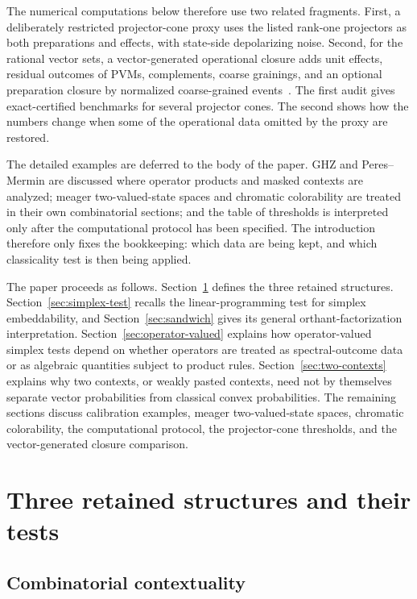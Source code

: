\documentclass[aps,pra,twocolumn,superscriptaddress,nofootinbib]{revtex4-2}
\begin{document}
The numerical computations below therefore use two related fragments.  First, a deliberately restricted projector-cone proxy uses the listed rank-one projectors as both preparations and effects, with state-side depolarizing noise.  Second, for the rational vector sets, a vector-generated operational closure adds unit effects, residual outcomes of PVMs, complements, coarse grainings, and an optional preparation closure by normalized coarse-grained events~\cite{schmid-2021-simplex,selby-2024-lp}.  The first audit gives exact-certified benchmarks for several projector cones.  The second shows how the numbers change when some of the operational data omitted by the proxy are restored.

The detailed examples are deferred to the body of the paper.  GHZ and Peres--Mermin are discussed where operator products and masked contexts are analyzed; meager two-valued-state spaces and chromatic colorability are treated in their own combinatorial sections; and the table of thresholds is interpreted only after the computational protocol has been specified.  The introduction therefore only fixes the bookkeeping: which data are being kept, and which classicality test is then being applied.

The paper proceeds as follows.  Section~\ref{sec:three-layers} defines the three retained structures.  Section~\ref{sec:simplex-test} recalls the linear-programming test for simplex embeddability, and Section~\ref{sec:sandwich} gives its general orthant-factorization interpretation.  Section~\ref{sec:operator-valued} explains how operator-valued simplex tests depend on whether operators are treated as spectral-outcome data or as algebraic quantities subject to product rules.  Section~\ref{sec:two-contexts} explains why two contexts, or weakly pasted contexts, need not by themselves separate vector probabilities from classical convex probabilities.  The remaining sections discuss calibration examples, meager two-valued-state spaces, chromatic colorability, the computational protocol, the projector-cone thresholds, and the vector-generated closure comparison.

\section{Three retained structures and their tests}
\label{sec:three-layers}

\subsection{Combinatorial contextuality}
\end{document}
